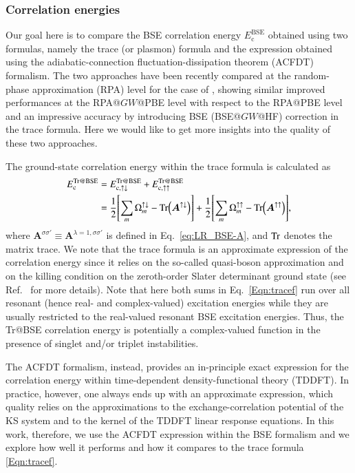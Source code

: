 \documentclass[aps,prb,reprint,superscriptaddress]{revtex4-1}
\makeatletter
\newcommand{\IS}{\lambda}
\newcommand{\singlet}{\uparrow\downarrow}
\newcommand{\triplet}{\uparrow\uparrow}
\newcommand{\EcBSE}{E_\text{c}^\text{BSE}}
\newcommand{\EcTr}[1]{E_{\text{c},#1}^\text{Tr@BSE}}
\newcommand{\EcTrBSE}{E_\text{c}^\text{Tr@BSE}}
\newcommand{\Om}[2]{\Omega_{#1}^{#2}}
\newcommand{\bA}[1]{\boldsymbol{A}^{#1}}
\makeatother
\begin{document}
\subsubsection{Correlation energies}
Our goal here is to compare the BSE correlation energy $\EcBSE$ obtained using two formulas, namely the trace (or plasmon) formula \citep{Ring-Schuck,Rowe_1968} 
and the expression obtained using the adiabatic-connection fluctuation-dissipation theorem (ACFDT) formalism. \citep{Furche_2005,Toulouse_2009,Toulouse_2010,Hellgren_JCP2010,Hesselmann_PRL2011,Angyan_2011,Colonna_2014,Maggio_2016,Holzer_2018b,Loos_2020e} The two approaches have been recently compared at the random-phase approximation (RPA) level for the case of , \citep{Li_2020} showing similar improved performances at the RPA@$GW$@PBE level with respect to the RPA@PBE level and an impressive accuracy by introducing BSE (BSE@$GW$@HF) correction in the trace formula. Here we would like to get more insights into the quality of these two approaches.

The ground-state correlation energy within the trace formula is calculated as
\begin{equation}
\begin{split}
 	\label{Eqn:tracef}
	\EcTrBSE 
	& = \EcTr{\singlet} + \EcTr{\triplet} 
	\\
	& = \frac{1}{2}\qty[ \sum_{m} \Om{m}{\singlet} - \Tr(\bA{\singlet}) ] + \frac{1}{2}\qty[ \sum_{m} \Om{m}{\triplet} - \Tr(\bA{\triplet}) ],
\end{split}
\end{equation}
where $\bA{\sigma\sigma'} \equiv \bA{\IS=1,\sigma\sigma'}$ is defined in Eq.~\eqref{eq:LR_BSE-A}, and $\Tr$ denotes the matrix trace. We note that the trace formula is an approximate expression of the correlation energy since it relies on the so-called quasi-boson approximation
and on the killing condition on the zeroth-order Slater determinant ground state (see Ref.~\citep{Li_2020} for more details).
Note that here both sums in Eq.~\eqref{Eqn:tracef} run over all resonant (hence real- and complex-valued) excitation energies while they are usually restricted to the real-valued resonant BSE excitation energies. Thus, the Tr@BSE correlation energy is potentially a complex-valued function in the presence of singlet and/or triplet instabilities.


The ACFDT formalism, \citep{Furche_2005} instead, provides an in-principle exact expression for the correlation energy within time-dependent density-functional theory (TDDFT). \citep{Runge_1984,Petersilka_1996,UlrichBook} In practice, however, one always ends up with an approximate expression, which quality relies on the approximations to the exchange-correlation potential of the KS system and to the kernel of the TDDFT linear response equations. In this work, therefore, we use the ACFDT expression within the BSE formalism and we explore how well it performs and how it compares to the trace formula \eqref{Eqn:tracef}.
\end{document}
